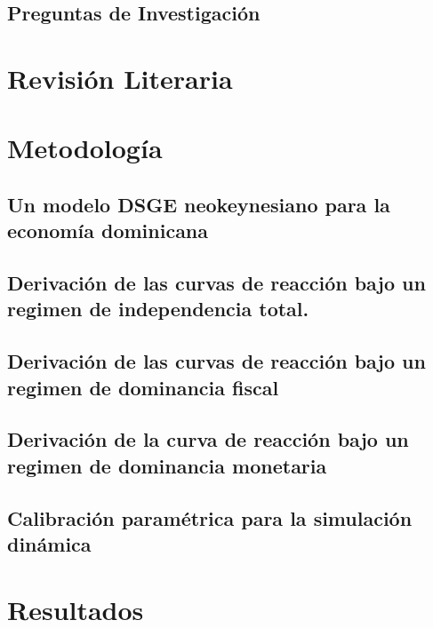 \documentclass[
  authoryear,
  review]{elsarticle}
\begin{document}
\subsection{Preguntas de
Investigación}\label{preguntas-de-investigaciuxf3n}

\section{Revisión Literaria}\label{revisiuxf3n-literaria}

\section{Metodología}\label{metodologuxeda}

\subsection{Un modelo DSGE neokeynesiano para la economía
dominicana}\label{un-modelo-dsge-neokeynesiano-para-la-economuxeda-dominicana}

\subsection{Derivación de las curvas de reacción bajo un regimen de
independencia
total.}\label{derivaciuxf3n-de-las-curvas-de-reacciuxf3n-bajo-un-regimen-de-independencia-total.}

\subsection{Derivación de las curvas de reacción bajo un regimen de
dominancia
fiscal}\label{derivaciuxf3n-de-las-curvas-de-reacciuxf3n-bajo-un-regimen-de-dominancia-fiscal}

\subsection{Derivación de la curva de reacción bajo un regimen de
dominancia
monetaria}\label{derivaciuxf3n-de-la-curva-de-reacciuxf3n-bajo-un-regimen-de-dominancia-monetaria}

\subsection{Calibración paramétrica para la simulación
dinámica}\label{calibraciuxf3n-paramuxe9trica-para-la-simulaciuxf3n-dinuxe1mica}

\section{Resultados}\label{resultados}
\end{document}
